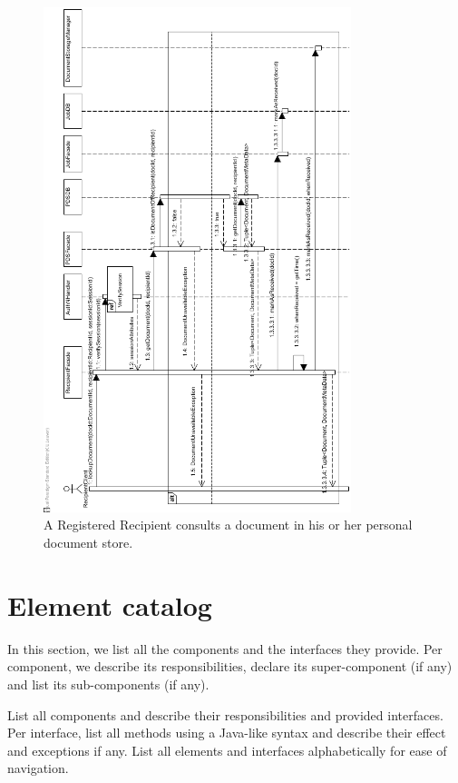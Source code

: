 \documentclass[a4paper,10pt]{article}
\begin{document}
\begin{figure}[!htp]
    \centering
    \includegraphics[width=0.8\textwidth]{Seq_UC14ConsultDocumentInPDS.png}
    \caption{A Registered Recipient consults a document in his or her personal document store.
        }\label{fig:seq_UC14ConsultdocumentInPDS}
\end{figure}

\FloatBarrier

\appendix
\section{Element catalog}\label{app:catalog}
In this section, we list all the components and the interfaces they provide. Per component, we describe its responsibilities, declare its super-component (if any) and list its sub-components (if any).



List all components and describe their responsibilities and provided
interfaces.
Per interface, list all methods using a Java-like syntax and describe their
effect and exceptions if any.
List all elements and interfaces alphabetically for ease of navigation.
\end{document}
